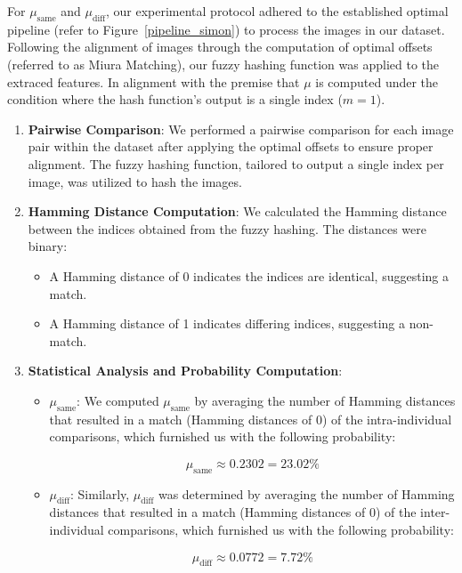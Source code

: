 For \(\mu_{\text{same}}\) and \(\mu_{\text{diff}}\), our experimental protocol adhered to the established optimal pipeline (refer to Figure~\ref{pipeline_simon}) to process the images in our dataset. Following the alignment of images through the computation of optimal offsets (referred to as Miura Matching), our fuzzy hashing function was applied to the extraced features. In alignment with the premise that \(\mu\) is computed under the condition where the hash function's output is a single index (\(m=1\)).

\begin{enumerate}
    \item \textbf{Pairwise Comparison}: We performed a pairwise comparison for each image pair within the dataset after applying the optimal offsets to ensure proper alignment. The fuzzy hashing function, tailored to output a single index per image, was utilized to hash the images.

    \item \textbf{Hamming Distance Computation}: We calculated the Hamming distance between the indices obtained from the fuzzy hashing. The distances were binary:
    \begin{itemize}
        \item A Hamming distance of 0 indicates the indices are identical, suggesting a match.
        \item A Hamming distance of 1 indicates differing indices, suggesting a non-match.
    \end{itemize}
    
    \item \textbf{Statistical Analysis and Probability Computation}:
    \begin{itemize}
        \item \textbf{\(\mu_{\text{same}}\)}: We computed \(\mu_{\text{same}}\) by averaging the number of Hamming distances that resulted in a match (Hamming distances of 0) of the intra-individual comparisons, which furnished us with the following probability:

        \[ \mu_{\text{same}} \approx 0.2302 = 23.02\%\] 
        
        \item \textbf{\(\mu_{\text{diff}}\)}: Similarly, \(\mu_{\text{diff}}\) was determined by averaging the number of Hamming distances that resulted in a match (Hamming distances of 0) of the inter-individual comparisons, which furnished us with the following probability:

        \[ \mu_{\text{diff}} \approx 0.0772 = 7.72\% \]
    \end{itemize}
\end{enumerate}

